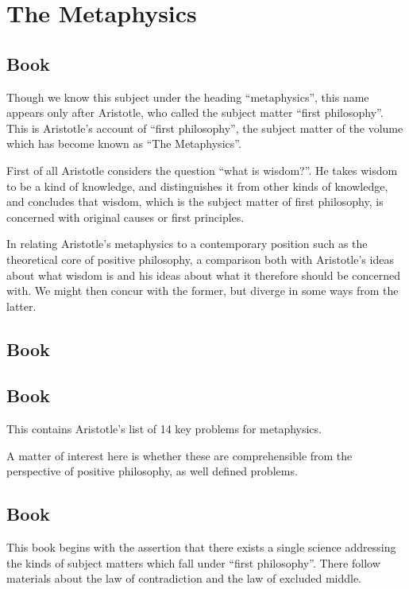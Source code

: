 \chapter{The Metaphysics}

\section{Book \RbjAlpha}

Though we know this subject under the heading ``metaphysics'', this name appears only after Aristotle, who called the subject matter ``first philosophy''.
This is Aristotle's account of ``first philosophy'', the subject matter of the volume which has become known as ``The Metaphysics''.

First of all Aristotle considers the question ``what is wisdom?''.
He takes wisdom to be a kind of knowledge, and distinguishes it from other kinds of knowledge, and concludes that wisdom, which is the subject matter of first philosophy, is concerned with original causes or first principles.

In relating Aristotle's metaphysics to a contemporary position such as the theoretical core of positive philosophy, a comparison both with Aristotle's ideas about what wisdom is and his ideas about what it therefore should be concerned with.
We might then concur with the former, but diverge in some ways from the latter.

\section{Book \Rbjalpha}

\section{Book \RbjBeta}

This contains Aristotle's list of 14 key problems for metaphysics.

A matter of interest here is whether these are comprehensible from the perspective of positive philosophy, as well defined problems.

\section{Book \RbjGamma}

This book begins with the assertion that there exists a single science addressing the kinds of subject matters which fall under ``first philosophy''.
There follow materials about the law of contradiction and the law of excluded middle.

